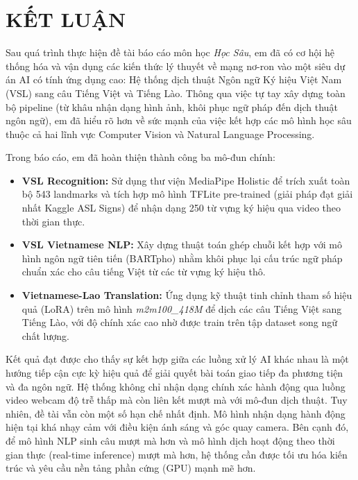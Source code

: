 ﻿\newpage

\section*{KẾT LUẬN}

Sau quá trình thực hiện đề tài báo cáo môn học \textit{Học Sâu}, em đã có cơ hội hệ thống hóa và vận dụng các kiến thức lý thuyết về mạng nơ-ron vào một siêu dự án AI có tính ứng dụng cao: Hệ thống dịch thuật Ngôn ngữ Ký hiệu Việt Nam (VSL) sang câu Tiếng Việt và Tiếng Lào. Thông qua việc tự tay xây dựng toàn bộ pipeline (từ khâu nhận dạng hình ảnh, khôi phục ngữ pháp đến dịch thuật ngôn ngữ), em đã hiểu rõ hơn về sức mạnh của việc kết hợp các mô hình học sâu thuộc cả hai lĩnh vực Computer Vision và Natural Language Processing.

Trong báo cáo, em đã hoàn thiện thành công ba mô-đun chính:

\begin{itemize}
    \item \textbf{VSL Recognition:} Sử dụng thư viện MediaPipe Holistic để trích xuất toàn bộ 543 landmarks và tích hợp mô hình TFLite pre-trained (giải pháp đạt giải nhất Kaggle ASL Signs) để nhận dạng 250 từ vựng ký hiệu qua video theo thời gian thực.
    \item \textbf{VSL Vietnamese NLP:} Xây dựng thuật toán ghép chuỗi kết hợp với mô hình ngôn ngữ tiên tiến (BARTpho) nhằm khôi phục lại cấu trúc ngữ pháp chuẩn xác cho câu tiếng Việt từ các từ vựng ký hiệu thô.
    \item \textbf{Vietnamese-Lao Translation:} Ứng dụng kỹ thuật tinh chỉnh tham số hiệu quả (LoRA) trên mô hình \textit{m2m100\_418M} để dịch các câu Tiếng Việt sang Tiếng Lào, với độ chính xác cao nhờ được train trên tập dataset song ngữ chất lượng.
\end{itemize}

Kết quả đạt được cho thấy sự kết hợp giữa các luồng xử lý AI khác nhau là một hướng tiếp cận cực kỳ hiệu quả để giải quyết bài toán giao tiếp đa phương tiện và đa ngôn ngữ. Hệ thống không chỉ nhận dạng chính xác hành động qua luồng video webcam độ trễ thấp mà còn liên kết mượt mà với mô-đun dịch thuật. Tuy nhiên, đề tài vẫn còn một số hạn chế nhất định. Mô hình nhận dạng hành động hiện tại khá nhạy cảm với điều kiện ánh sáng và góc quay camera. Bên cạnh đó, để mô hình NLP sinh câu mượt mà hơn và mô hình dịch hoạt động theo thời gian thực (real-time inference) mượt mà hơn, hệ thống cần được tối ưu hóa kiến trúc và yêu cầu nền tảng phần cứng (GPU) mạnh mẽ hơn.


